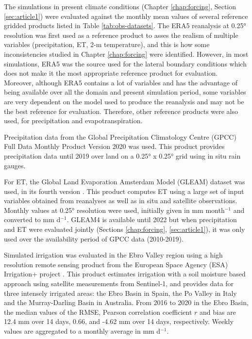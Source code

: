 The simulations in present climate conditions (Chapter \ref{chap:forcing}, Section \ref{sec:article1}) were evaluated against the monthly mean values of several reference gridded products listed in Table \ref{tab:obs-datasets}.
The ERA5 reanalysis \citep{hersbach_era5_2020} at 0.25° resolution was first used as a reference product to asses the realism of multiple variables (precipitation, ET, 2-m temperature), and this is how some inconsistencies studied in Chapter \ref{chap:forcing} were identified. However, in most simulations, ERA5 was the source used for the lateral boundary conditions which does not make it the most appropriate reference product for evaluation. Moreover, although ERA5 contains a lot of variables and has the advantage of being available over all the domain and present simulation period, some variables are very dependent on the model used to produce the reanalysis and may not be the best reference for evaluation. Therefore, other reference products were also used, for precipitation and evapotranspiration.

Precipitation data from the Global Precipitation Climatology Centre (GPCC) Full Data Monthly Product Version 2020 \citep{gpcc_v2020} was used. This product provides precipitation data until 2019 over land on a 0.25° x 0.25° grid using in situ rain gauges. 

For ET, the Global Land Evaporation Amsterdam Model (GLEAM) dataset was used, in its fourth version \citep{miralles_gleam4_2025}. This product computes ET using a large set of input variables obtained from reanalyses as well as in situ and satellite observations. Monthly values at 0.25° resolution were used, initially given in mm month$^{-1}$ and converted to mm d$^{-1}$. GLEAM4 is available until 2022 but when precipitation and ET were evaluated jointly (Sections \ref{chap:forcing}, \ref{sec:article1}), it was only used over the availability period of GPCC data (2010-2019).

Simulated irrigation was evaluated in the Ebro Valley region using a high resolution remote sensing product from the European Space Agency (ESA) Irrigation+ project \citep{dari_regional_2023}. This product estimates irrigation with a soil moisture based approach using satellite measurements from Sentinel-1, and provides data for three intensely irrigated areas: the Ebro Basin in Spain, the Po Valley in Italy and the Murray-Darling Basin in Australia. From 2016 to 2020 in the Ebro Basin, the median values of the RMSE, Pearson correlation coefficient $r$ and bias are 12.4 mm over 14 days, 0.66, and -4.62 mm over 14 days, respectively. Weekly values are aggregated to a monthly average in mm d$^{-1}$. 

